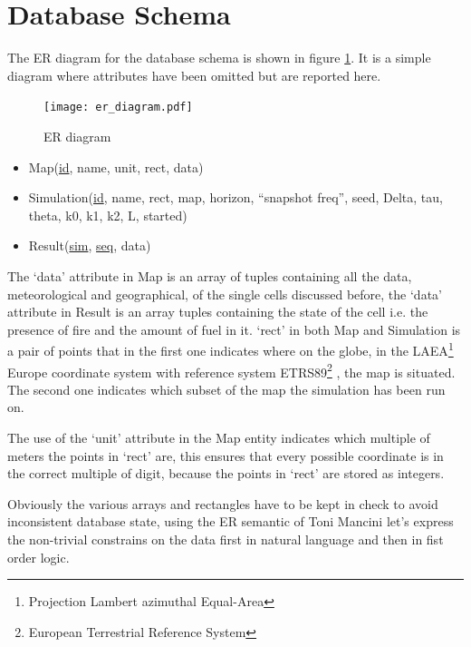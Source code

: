 \documentclass[Lau]{sapthesis} %
\let\oldsection\section
\def\subsection{\oldsection}
\def\section{\chapter}
\begin{document}
\subsection{Database Schema}\label{sec:schema}

The ER diagram for the database schema is shown in figure \ref{fig:er}. It is a
simple diagram where attributes have been omitted but are reported here.

\begin{figure} %
\centering
\setlength{\unitlength}{1cm}
\texttt{[image: er\_diagram.pdf]}
\caption{ER diagram}
\label{fig:er}
\end{figure}

\begin{itemize}
\item Map(\underline{id}, name, unit, rect, data)
\item Simulation(\underline{id}, name, rect, map, horizon, ``snapshot freq'',
seed, Delta, tau, theta, k0, k1, k2, L, started)
\item Result(\underline{sim}, \underline{seq}, data)
\end{itemize}

The `data' attribute in Map is an array of tuples containing all the data,
meteorological and geographical, of the single cells discussed before, the
`data' attribute in Result is an array tuples containing the state of the cell
i.e. the presence of fire and the amount of fuel in it. `rect' in both Map and
Simulation is a pair of points that in the first one indicates where on the
globe, in the LAEA\footnote{Projection Lambert azimuthal Equal-Area} Europe
\cite{laeae} coordinate system with reference system ETRS89\footnote{European
Terrestrial Reference System} \cite{etrs89}, the map is situated. The second one
indicates which subset of the map the simulation has been run on.

The use of the `unit' attribute in the Map entity indicates which multiple of
meters the points in `rect' are, this ensures that every possible coordinate is
in the correct multiple of digit, because the points in `rect' are stored as
integers.

Obviously the various arrays and rectangles have to be kept in check to avoid
inconsistent database state, using the ER semantic of Toni Mancini \cite{bd2}
let's express the non-trivial constrains on the data first in natural language
and then in fist order logic.
\end{document}
